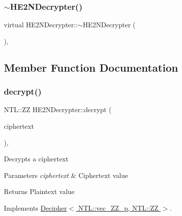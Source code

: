 \mbox{\label{classHE2NDecrypter_a2046b9ecd1f5de52fe99477859b23947}} 
\subsubsection{\texorpdfstring{$\sim$\+H\+E2\+N\+Decrypter()}{~HE2NDecrypter()}}
{\footnotesize\ttfamily virtual H\+E2\+N\+Decrypter\+::$\sim$\+H\+E2\+N\+Decrypter (\begin{DoxyParamCaption}{ }\end{DoxyParamCaption})\hspace{0.3cm}{\ttfamily [inline]}, {\ttfamily [virtual]}}



\subsection{Member Function Documentation}
\mbox{\label{classHE2NDecrypter_aa92e4ddf62a0f2c4199722983e28b0c9}} 
\subsubsection{\texorpdfstring{decrypt()}{decrypt()}}
{\footnotesize\ttfamily N\+T\+L\+::\+ZZ H\+E2\+N\+Decrypter\+::decrypt (\begin{DoxyParamCaption}\item[{N\+T\+L\+::vec\+\_\+\+Z\+Z\+\_\+p \&}]{ciphertext }\end{DoxyParamCaption})\hspace{0.3cm}{\ttfamily [override]}, {\ttfamily [virtual]}}

Decrypts a ciphertext 
\begin{DoxyParams}{Parameters}
{\em ciphertext} & Ciphertext value \\
\hline
\end{DoxyParams}
\begin{DoxyReturn}{Returns}
Plaintext value 
\end{DoxyReturn}


Implements \hyperlink{classDecipher_ac6b8c369eda2d7e17fa90cb594cf41b6}{Decipher$<$ N\+T\+L\+::vec\+\_\+\+Z\+Z\+\_\+p, N\+T\+L\+::\+Z\+Z $>$}.

